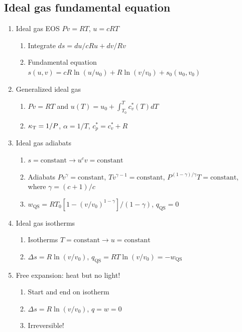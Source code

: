 \documentclass[11pt]{article}
\begin{document}
\subsection{Ideal gas fundamental equation}
\label{sec:org32fac82}
\begin{enumerate}
\item Ideal gas EOS \(Pv=RT\), \(u=cRT\)
\begin{enumerate}
\item Integrate \(ds = du/cRu + dv/Rv\)
\item Fundamental equation \(s(u,v)=cR \ln(u/u_0)+R  \ln (v/v_0) + s_0(u_0,v_0)\)
\end{enumerate}
\item Generalized ideal gas
\begin{enumerate}
\item \(Pv=RT\) and \(u(T) = u_0 + \int_{T_0}^T c_v^*(T) dT\)
\item \(\kappa_{\rm T} = 1/P\), \(\alpha=1/T\), \(c_p^*=c_v^*+R\)
\end{enumerate}
\item Ideal gas adiabats
\begin{enumerate}
\item \(s =\text{constant} \rightarrow u^cv = \text{constant}\)
\item Adiabats \(P v^\gamma = \text{constant}\), \(T v^{\gamma-1}=\text{constant}\), \(P^{(1-\gamma)/\gamma}T  = \text{constant}\), where \(\gamma=(c+1)/c\)
\item \(w_\text{QS}=R T_0 \left [ 1-(v/v_0)^{1-\gamma} \right ]/(1-\gamma)\), \(q_\text{QS}=0\)
\end{enumerate}
\item Ideal gas isotherms
\begin{enumerate}
\item Isotherms \(T = \text{constant} \rightarrow u = \text{constant}\)
\item \(\Delta s = R \ln(v/v_0)\), \(q_\text{QS}=RT \ln(v/v_0)=-w_\text{QS}\)
\end{enumerate}
\item Free expansion: heat but no light!
\begin{enumerate}
\item Start and end on isotherm
\item \(\Delta s = R \ln(v/v_0)\), \(q =w =0\)
\item Irreversible!
\end{enumerate}
\end{enumerate}
\end{document}
